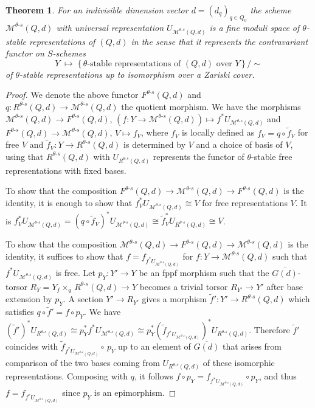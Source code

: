 \documentclass[10pt,a4paper]{amsart}
\newtheorem{theo}{Theorem}[section]
\theoremstyle{definition}
\begin{document}
\begin{theo}\label{thm:modulireprquiver}
For an indivisible dimension vector $d=(d_q)_{q\in Q_0}$ the scheme 
$\mathcal M^{\theta\text{-}s}(Q,d)$ with universal representation 
$U_{\mathcal M^{\theta\text{-}s}(Q,d)}$ is a fine moduli space of $\theta$-stable 
representations of $(Q,d)$ in the sense that it represents the contravariant 
functor on $S$-schemes
\[
Y\;\mapsto\;
\big\{\text{$\,\theta$-stable representations of $(Q,d)$ over $Y\,$}\big\}\,/\!\sim
\]
of $\theta$-stable representations up to isomorphism over a Zariski cover.
\end{theo}
\begin{proof}
We denote the above functor $F^{\theta\text{-}s}(Q,d)$ and 
$q\colon R^{\theta\text{-}s}(Q,d)\to\mathcal M^{\theta\text{-}s}(Q,d)$
the quotient morphism.
We have the morphisms $\mathcal M^{\theta\text{-}s}(Q,d)\to 
F^{\theta\text{-}s}(Q,d)$, $(f\colon Y\to\mathcal M^{\theta\text{-}s}(Q,d))
\mapsto f^*U_{\mathcal M^{\theta\text{-}s}(Q,d)}$ 
and $F^{\theta\text{-}s}(Q,d)\to\mathcal M^{\theta\text{-}s}(Q,d)$,
$V\mapsto f_V$, where $f_V$ is locally defined as $f_V=q\circ\tilde{f}_V$ 
for free $V$ and $\tilde{f}_V\colon Y\to R^{\theta\text{-}s}(Q,d)$ is determined
by $V$ and a choice of basis of $V$, using that $R^{\theta\text{-}s}(Q,d)$ with
$U_{R^{\theta\text{-}s}(Q,d)}$ represents the functor of $\theta$-stable 
free representations with fixed bases.

To show that the composition 
$F^{\theta\text{-}s}(Q,d)\to\mathcal M^{\theta\text{-}s}(Q,d)
\to F^{\theta\text{-}s}(Q,d)$ is the identity, it is enough to show that 
$f_V^*U_{\mathcal M^{\theta\text{-}s}(Q,d)}\cong V$ for free representations $V$.
It is $f_V^*U_{\mathcal M^{\theta\text{-}s}(Q,d)}
=(q\circ \tilde{f}_V)^*U_{\mathcal M^{\theta\text{-}s}(Q,d)}
\cong\tilde{f}_V^*U_{R^{\theta\text{-}s}(Q,d)}\cong V$.

To show that the composition 
$\mathcal M^{\theta\text{-}s}(Q,d)\to F^{\theta\text{-}s}(Q,d)\to
\mathcal M^{\theta\text{-}s}(Q,d)$ is the identity,
it suffices to show that $f=f_{f^*U_{\mathcal M^{\theta\text{-}s}(Q,d)}}$
for $f\colon Y\to\mathcal M^{\theta\text{-}s}(Q,d)$ such that
$f^*U_{\mathcal M^{\theta\text{-}s}(Q,d)}$ is free.
Let $p_Y\colon Y'\to Y$ be an fppf morphism such that the $\overline{G(d)}$-torsor 
$R_Y=Y{}_f\!\!\times_q\,R^{\theta\text{-}s}(Q,d)\to Y$ becomes a trivial torsor 
$R_{Y'}\to Y'$ after base extension by $p_Y$. A section $Y'\to R_{Y'}$ gives a 
morphism $\tilde{f}'\colon Y'\to R^{\theta\text{-}s}(Q,d)$ which satisfies 
$q\circ\tilde{f}'=f\circ p_Y$.
We have $(\tilde{f}')^*U_{R^{\theta\text{-}s}(Q,d)}\cong
p_Y^*f^*U_{\mathcal M^{\theta\text{-}s}(Q,d)}\cong
p_Y^*(\tilde{f}_{f^*U_{\mathcal M^{\theta\text{-}s}(Q,d)}})^*
U_{R^{\theta\text{-}s}(Q,d)}$.
Therefore $\tilde{f}'$ coincides with 
$\tilde{f}_{f^*U_{\mathcal M^{\theta\text{-}s}(Q,d)}}\!\circ\,p_Y$
up to an element of $\overline{G(d)}$ that arises from comparison of
the two bases coming from $U_{R^{\theta\text{-}s}(Q,d)}$ of these isomorphic 
representations. Composing with $q$, it follows 
$f\circ p_Y=f_{f^*U_{\mathcal M^{\theta\text{-}s}(Q,d)}}\circ p_Y$,
and thus $f=f_{f^*U_{\mathcal M^{\theta\text{-}s}(Q,d)}}$ since 
$p_Y$ is an epimorphism.
\end{proof}
\end{document}
